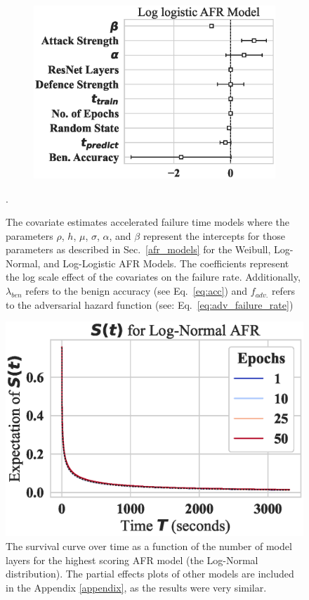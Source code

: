 \begin{figure}
\begin{subfigure}{0.32\textwidth}
        \includegraphics[width=\textwidth]{cifar100/log_logistic_aft.eps}
    \end{subfigure}
    
    \caption{The covariate estimates accelerated failure time models where the parameters $\rho$, $h$, $\mu$, $\sigma$, $\alpha$, and $\beta$ represent the intercepts for those parameters as described in Sec.~\ref{afr_models} for the Weibull, Log-Normal, and Log-Logistic AFR Models. The coefficients represent the log scale effect of the covariates on the failure rate. Additionally, $\lambda_{ben}$ refers to the benign accuracy (see Eq.~\ref{eq:acc}) and $f_{adv.}$ refers to the adversarial hazard function (see: Eq.~\ref{eq:adv_failure_rate})}.
    \label{fig:afr_models}
\end{figure}

% 
\begin{figure}
    \centering\includegraphics[width=.5\textwidth]{cifar100/log_normal_epochs_partial_effect.eps}
   \caption{The survival curve over time as a function of the number of model layers for the highest scoring AFR model (the Log-Normal distribution). The partial effects plots of other models are included in the Appendix \ref{appendix}, as the results were very similar.}
    \label{fig:layers}
\end{figure}
% 



